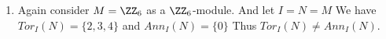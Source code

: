 \begin{enumerate}[label=]
    \item
        Again consider $M = \ZZ_6$ as a $\ZZ_6$-module. And let $I = N = M$ We have $Tor_I(N) = \{2, 3, 4\}$ and $Ann_I(N) = \{0\}$ Thus $Tor_I(N) \ne Ann_I(N)$.
\end{enumerate}
    
    